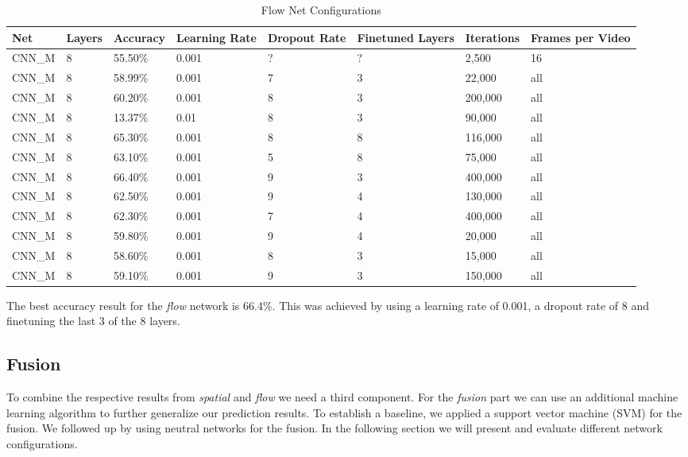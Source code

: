 \begin{table}[H]
\centering
\caption{Flow Net Configurations}
\label{table:flow_results}
\begin{tabularx}{\textwidth}{XXXXXXXX}
\toprule
Net 		& Layers	& Accuracy	& Learning Rate 	& Dropout Rate	& Finetuned Layers	& Iterations	& Frames per Video \\ \midrule

CNN\_M & 8 & 55.50\%  & 0.001 & ? & ? &   2,500 & 16\\
CNN\_M & 8 & 58.99\%  & 0.001 & 7 & 3 &  22,000 & all \\
CNN\_M & 8 & 60.20\%  & 0.001 & 8 & 3 & 200,000 & all \\
CNN\_M & 8 & 13.37\%  & 0.01  & 8 & 3 &  90,000 & all \\
CNN\_M & 8 & 65.30\%  & 0.001 & 8 & 8 & 116,000 & all \\
CNN\_M & 8 & 63.10\%  & 0.001 & 5 & 8 &  75,000 & all \\
CNN\_M & 8 & 66.40\%  & 0.001 & 9 & 3 & 400,000 & all \\
CNN\_M & 8 & 62.50\%  & 0.001 & 9 & 4 & 130,000 & all \\
CNN\_M & 8 & 62.30\%  & 0.001 & 7 & 4 & 400,000 & all \\
CNN\_M & 8 & 59.80\%  & 0.001 & 9 & 4 &  20,000 & all \\
CNN\_M & 8 & 58.60\%  & 0.001 & 8 & 3 &  15,000 & all \\
CNN\_M & 8 & 59.10\%  & 0.001 & 9 & 3 & 150,000 & all \\

\bottomrule
\end{tabularx}
\end{table}

The best accuracy result for the \emph{flow} network is 66.4\%.
This was achieved by using a learning rate of 0.001, a dropout rate of 8 and finetuning the last 3 of the 8 layers.

\subsection{Fusion}
\label{subsec:fusion}

To combine the respective results from \emph{spatial} and \emph{flow} we need a third component.
For the \emph{fusion} part we can use an additional machine learning algorithm to further generalize our prediction results.
To establish a baseline, we applied a support vector machine (SVM) for the fusion.
We followed up by using neutral networks for the fusion.
In the following section we will present and evaluate different network configurations.

